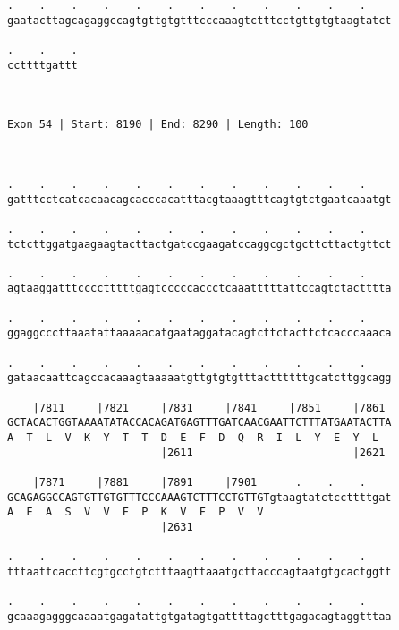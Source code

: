 \documentclass{article}
\begin{document}
\begin{Verbatim}
.    .    .    .    .    .    .    .    .    .    .    .    
gaatacttagcagaggccagtgttgtgtttcccaaagtctttcctgttgtgtaagtatct
                                                            
.    .    .
ccttttgattt
           
           
 
Exon 54 | Start: 8190 | End: 8290 | Length: 100



.    .    .    .    .    .    .    .    .    .    .    .    
gatttcctcatcacaacagcacccacatttacgtaaagtttcagtgtctgaatcaaatgt
                                                            
.    .    .    .    .    .    .    .    .    .    .    .    
tctcttggatgaagaagtacttactgatccgaagatccaggcgctgcttcttactgttct
                                                            
.    .    .    .    .    .    .    .    .    .    .    .    
agtaaggatttcccctttttgagtcccccaccctcaaatttttattccagtctactttta
                                                            
.    .    .    .    .    .    .    .    .    .    .    .    
ggaggcccttaaatattaaaaacatgaataggatacagtcttctacttctcacccaaaca
                                                            
.    .    .    .    .    .    .    .    .    .    .    .    
gataacaattcagccacaaagtaaaaatgttgtgtgtttacttttttgcatcttggcagg
                                                            
    |7811     |7821     |7831     |7841     |7851     |7861 
GCTACACTGGTAAAATATACCACAGATGAGTTTGATCAACGAATTCTTTATGAATACTTA
A  T  L  V  K  Y  T  T  D  E  F  D  Q  R  I  L  Y  E  Y  L  
                        |2611                         |2621 
  
    |7871     |7881     |7891     |7901      .    .    .    
GCAGAGGCCAGTGTTGTGTTTCCCAAAGTCTTTCCTGTTGTgtaagtatctccttttgat
A  E  A  S  V  V  F  P  K  V  F  P  V  V                    
                        |2631                               
  
.    .    .    .    .    .    .    .    .    .    .    .    
tttaattcaccttcgtgcctgtctttaagttaaatgcttacccagtaatgtgcactggtt
                                                            
.    .    .    .    .    .    .    .    .    .    .    .    
gcaaagagggcaaaatgagatattgtgatagtgattttagctttgagacagtaggtttaa
                                                            

\end{Verbatim}
\end{document}
